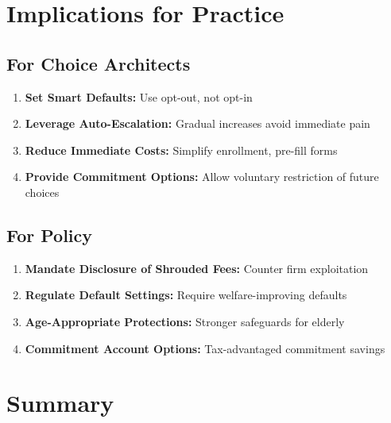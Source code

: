 \section{Implications for Practice}

\subsection{For Choice Architects}

\begin{enumerate}
    \item \textbf{Set Smart Defaults:} Use opt-out, not opt-in
    \item \textbf{Leverage Auto-Escalation:} Gradual increases avoid immediate pain
    \item \textbf{Reduce Immediate Costs:} Simplify enrollment, pre-fill forms
    \item \textbf{Provide Commitment Options:} Allow voluntary restriction of future choices
\end{enumerate}

\subsection{For Policy}

\begin{enumerate}
    \item \textbf{Mandate Disclosure of Shrouded Fees:} Counter firm exploitation
    \item \textbf{Regulate Default Settings:} Require welfare-improving defaults
    \item \textbf{Age-Appropriate Protections:} Stronger safeguards for elderly
    \item \textbf{Commitment Account Options:} Tax-advantaged commitment savings
\end{enumerate}

\section{Summary}

